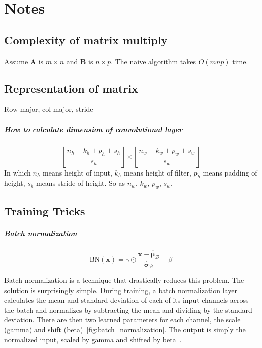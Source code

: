 \chapter{Notes}\label{chap:Notes}

\section{Complexity of matrix multiply}\label{sec:Complexity of matrix multiply}

Assume $\mathbf{A}$ is $m\times n$ and $\mathbf{B}$ is $n\times p$.
The naive algorithm takes $O\left(mnp\right)$ time.


\section{Representation of matrix}\label{sec:Representation of matrix}

Row major, col major, stride


\paragraph{How to calculate dimension of convolutional layer} %

\[ \left\lfloor \frac{n_h - k_h + p_h + s_h}{s_h} \right\rfloor \times \left\lfloor \frac{n_w - k_w + p_w + s_w}{s_w} \right\rfloor \]
In which  \(n_h\)  means height of input, \(k_h\) means height of filter, \(p_h\) means padding of height, \(s_h\) means stride of height. So as \(n_w\), \(k_w\), \(p_w\), \(s_w\).


\section{Training Tricks}\label{sec:Training skills}


\paragraph{Batch normalization}

\[ \textrm{BN}\left(\bm{x}\right)  = \gamma  \odot \frac{\bm{x} - \hat{\bm \mu}_\mathcal{B}}{\hat{\bm \sigma}_\mathcal{B}} + \beta
\]

Batch normalization is a technique that drastically reduces this problem.
The solution is surprisingly simple.
During training, a batch normalization layer calculates the mean and standard deviation of each of its input channels across the batch and normalizes by subtracting the mean and dividing by the standard deviation.
There are then two learned parameters for each channel, the scale (gamma) and shift (beta)~\cref{fig:batch_normalization}.
The output is simply the normalized input, scaled by gamma and shifted by beta~\cite{foster2022generative}.


